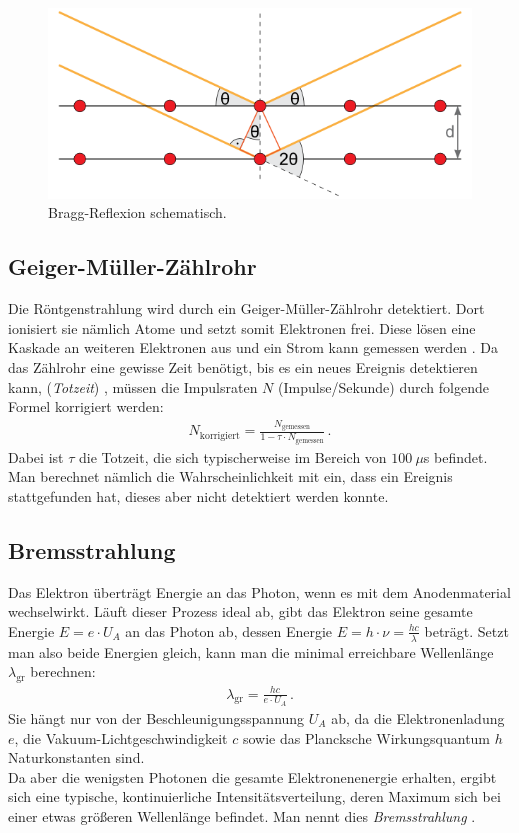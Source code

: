 \documentclass[12pt,a4paper,titlepage,headinclude,bibtotoc]{scrartcl}
\begin{document}
\begin{figure}[!h]
	\centering
	\includegraphics[scale=0.7]{Bragg.png}
	\caption{Bragg-Reflexion schematisch. \cite[Datum: 02.01.15]{LP23}}
	\label{fig:Bragg}
\end{figure}

\subsection{Geiger-Müller-Zählrohr}
Die Röntgenstrahlung wird durch ein Geiger-Müller-Zählrohr detektiert.
Dort ionisiert sie nämlich Atome und setzt somit Elektronen frei.
Diese lösen eine Kaskade an weiteren Elektronen aus und ein Strom kann gemessen werden \cite[S.481ff]{gerthsen}.
Da das Zählrohr eine gewisse Zeit benötigt, bis es ein neues Ereignis detektieren kann, (\emph{Totzeit}) \cite[S.950]{gerthsen}, müssen die Impulsraten $N$ (Impulse/Sekunde) durch folgende Formel korrigiert werden:
\begin{align}
	N_\text{korrigiert}=\frac{N_\text{gemessen}}{1-\tau\cdot N_\text{gemessen}}\,.
	\label{eq:totzeit}
\end{align}
Dabei ist $\tau$ die Totzeit, die sich typischerweise im Bereich von $100 ~ \mu$s befindet.
Man berechnet nämlich die Wahrscheinlichkeit mit ein, dass ein Ereignis stattgefunden hat, dieses aber nicht detektiert werden konnte.

\subsection{Bremsstrahlung}
Das Elektron überträgt Energie an das Photon, wenn es mit dem Anodenmaterial wechselwirkt.
Läuft dieser Prozess ideal ab, gibt das Elektron seine gesamte Energie $E=e\cdot U_A$ an das Photon ab, dessen Energie $E=h\cdot \nu=\frac{hc}{\lambda}$ beträgt.
Setzt man also beide Energien gleich, kann man die minimal erreichbare Wellenlänge $\lambda_\text{gr}$ berechnen:
\begin{align}
	\lambda_\text{gr}=\frac{hc}{e \cdot U_A}\,.
	\label{eq:grenzLambda}
\end{align}
Sie hängt nur von der Beschleunigungsspannung $U_A$ ab, da die Elektronenladung $e$, die Vakuum-Lichtgeschwindigkeit $c$ sowie das Plancksche Wirkungsquantum $h$ Naturkonstanten sind.\\
Da aber die wenigsten Photonen die gesamte Elektronenenergie erhalten, ergibt sich eine typische, kontinuierliche Intensitätsverteilung, deren Maximum sich bei einer etwas größeren Wellenlänge befindet.
Man nennt dies \emph{Bremsstrahlung} \cite[S.835]{gerthsen}.
\end{document}
